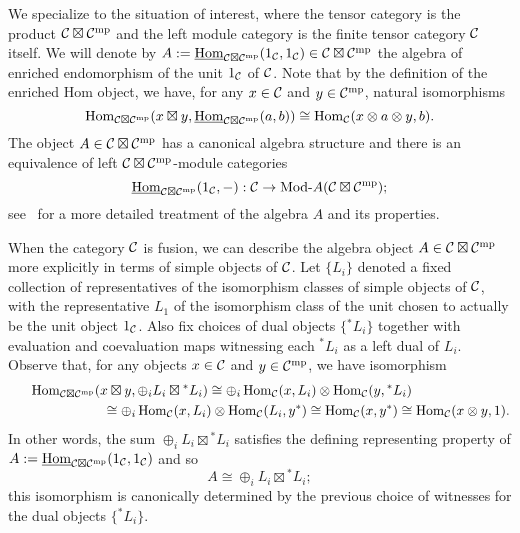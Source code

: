 \documentclass{amsart}
\begin{document}
We specialize to the situation of interest, where the tensor category is the product $\mathcal C \boxtimes \mathcal C^{\mathrm{mp}}$ and the left module category is the finite tensor category $\mathcal C$ itself.  We will denote by $A := \operatorname{\underline{Hom}}_{\mathcal C \boxtimes \mathcal C^{\mathrm{mp}}}(1_\mathcal C,1_\mathcal C) \in \mathcal C \boxtimes \mathcal C^{\mathrm{mp}}$ the algebra of enriched endomorphism of the unit $1_\mathcal C$ of $\mathcal C$.  Note that by the definition of the enriched Hom object, we have, for any $x \in \mathcal C$ and $y \in \mathcal C^{\mathrm{mp}}$, natural isomorphisms
\[
\operatorname{Hom}_{\mathcal C \boxtimes \mathcal C^{\mathrm{mp}}}(x \boxtimes y, \operatorname{\underline{Hom}}_{\mathcal C \boxtimes \mathcal C^{\mathrm{mp}}}(a,b)) \cong \operatorname{Hom}_\mathcal C(x \otimes a \otimes y,b).
\]
The object $A \in \mathcal C \boxtimes \mathcal C^{\mathrm{mp}}$ has a canonical algebra structure and there is an equivalence of left $\mathcal C \boxtimes \mathcal C^{\mathrm{mp}}$-module categories
\[
\IHom_{\cC \boxtimes \cC^\mp}(1_\cC,-) : \cC \ra \Mod{}{A}(\cC \boxtimes \cC^\mp);
\]
see~\cite[\S 2]{MR2097289} for a more detailed treatment of the algebra $A$ and its properties.

When the category $\mathcal C$ is fusion, we can describe the algebra object $A \in \mathcal C \boxtimes \mathcal C^{\mathrm{mp}}$ more explicitly in terms of simple objects of $\mathcal C$.  Let $\{L_i\}$ denoted a fixed collection of representatives of the isomorphism classes of simple objects of $\mathcal C$, with the representative $L_1$ of the isomorphism class of the unit chosen to actually be the unit object $1_\mathcal C$.  Also fix choices of dual objects $\{{}^* L_i\}$ together with evaluation and coevaluation maps witnessing each ${}^* L_i$ as a left dual of $L_i$.  Observe that, for any objects $x \in \mathcal C$ and $y \in \mathcal C^{\mathrm{mp}}$, we have isomorphism
\[
\begin{split}
\operatorname{Hom}_{\mathcal C \boxtimes \mathcal C^{\mathrm{mp}}}( x \boxtimes y , \oplus_i L_i \boxtimes {}^* L_i)
\cong
\oplus_i \operatorname{Hom}_{\mathcal C}(x, L_i) \otimes \operatorname{Hom}_{\mathcal C}(y, {}^*L_i) \hspace*{1in}\\\hspace*{1in}
\cong
\oplus_i \operatorname{Hom}_{\mathcal C}(x, L_i) \otimes \operatorname{Hom}_{\mathcal C}(L_i, y^*)
\cong
\operatorname{Hom}_{\mathcal C}(x, y^*)
\cong
\operatorname{Hom}_{\mathcal C}(x \otimes y, 1).
\end{split}
\]
In other words, the sum $\oplus_i L_i \boxtimes {}^* L_i$ satisfies the defining representing property of $A := \operatorname{\underline{Hom}}_{\mathcal C \boxtimes \mathcal C^{\mathrm{mp}}}(1_\mathcal C,1_\mathcal C)$ and so
\[
A \cong \oplus_i L_i \boxtimes {}^* L_i;
\]
this isomorphism is canonically determined by the previous choice of witnesses for the dual objects $\{{}^* L_i\}$.
\end{document}
